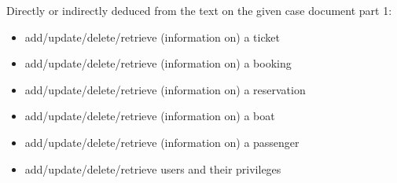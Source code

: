 Directly or indirectly deduced from the text on the given case document part 1:
\begin{itemize}
\item add/update/delete/retrieve (information on) a ticket
\item add/update/delete/retrieve (information on) a booking
\item add/update/delete/retrieve (information on) a reservation
\item add/update/delete/retrieve (information on) a boat
\item add/update/delete/retrieve (information on) a passenger
\item add/update/delete/retrieve users and their privileges\\
\end{itemize}